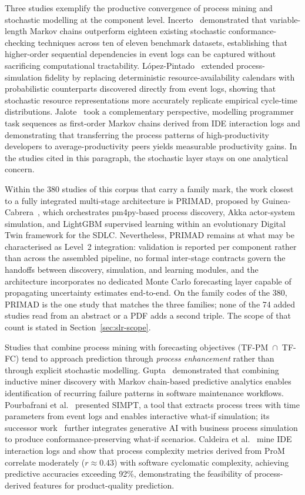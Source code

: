 Three studies exemplify the productive convergence of process mining and
stochastic modelling at the component level. Incerto~\cite{incerto2025}
demonstrated that variable-length Markov chains outperform eighteen existing
stochastic conformance-checking techniques across ten of eleven benchmark
datasets, establishing that higher-order sequential dependencies in event logs
can be captured without sacrificing computational tractability.
L\'opez-Pintado~\cite{lopezpintado2023} extended process-simulation fidelity by
replacing deterministic resource-availability calendars with probabilistic
counterparts discovered directly from event logs, showing that stochastic
resource representations more accurately replicate empirical cycle-time
distributions. Jalote~\cite{jalote2021} took a complementary perspective,
modelling programmer task sequences as first-order Markov chains derived from
IDE interaction logs and demonstrating that transferring the process patterns of
high-productivity developers to average-productivity peers yields measurable
productivity gains. In the studies cited in this paragraph, the stochastic
layer stays on one analytical concern.

Within the 380 studies of this corpus that carry a family mark, the work
closest to a fully integrated multi-stage architecture is
PRIMAD, proposed by Guinea-Cabrera~\cite{guinea2025}, which orchestrates
pm4py-based process discovery, Akka actor-system simulation, and LightGBM
supervised learning within an evolutionary Digital Twin framework for the SDLC.
Nevertheless, PRIMAD remains at what may be characterised as Level~2 integration:
validation is reported per component rather than across the assembled pipeline,
no formal inter-stage contracts govern the handoffs between discovery,
simulation, and learning modules, and the architecture incorporates no dedicated
Monte Carlo forecasting layer capable of propagating uncertainty estimates
end-to-end. On the family codes of the 380, PRIMAD is the one study that
matches the three families; none of the 74 added studies read from an
abstract or a PDF adds a second triple. The scope of that count is stated
in Section~\ref{sec:slr-scope}.

Studies that combine process mining with forecasting objectives (TF-PM~$\cap$~TF-FC)
tend to approach prediction through \emph{process enhancement} rather than
through explicit stochastic modelling. Gupta~\cite{gupta2017} demonstrated that
combining inductive miner discovery with Markov chain-based predictive analytics
enables identification of recurring failure patterns in software maintenance
workflows. Pourbafrani et al.~\cite{pourbafrani2021} presented SIMPT, a tool
that extracts process trees with time parameters from event logs and enables
interactive what-if simulation; its successor work~\cite{buliga2025} further
integrates generative AI with business process simulation to produce
conformance-preserving what-if scenarios. Caldeira et al.~\cite{caldeira2022}
mine IDE interaction logs and show that process complexity metrics derived from
ProM correlate moderately ($r \approx 0.43$) with software cyclomatic
complexity, achieving predictive accuracies exceeding 92\%, demonstrating the
feasibility of process-derived features for product-quality prediction.

